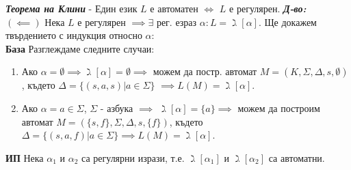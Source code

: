 \documentclass[fleqn,12pt]{article}
\begin{document}
\begin{flushleft}
\textit{\textbf{Теорема на Клини}} - Един език $L$ е автоматен $\iff$ $L$ е регулярен.
\textit{\textbf{Д-во:}}\\
$(\impliedby)$ Нека $L$ е регулярен $\implies \exists$ рег. езраз $\alpha: L = \gimel[\alpha]$. Ще докажем твърдението с индукция относно $\alpha$: \\
\textbf{База} Разглеждаме следните случаи:
\begin{enumerate}
    \item Ако $\alpha = \emptyset \implies \gimel[\alpha] = \emptyset \implies$ можем да постр. автомат $M = (K, \Sigma, \Delta, s, \emptyset)$, където $\Delta = \{(s, a, s) | a \in \Sigma\}$ $\implies L(M) = \gimel[\alpha]$. \\
    \item Ако $\alpha = a \in \Sigma$, $\Sigma$ - азбука $\implies$ $\gimel[\alpha] = \{a\} \implies$ можем да построим автомат $M = (\{s, f\}, \Sigma, \Delta, s, \{f\})$, където $\Delta = \{(s, a, f) | a \in \Sigma\} \implies L(M) = \gimel[\alpha]$.\\
\end{enumerate}

\textbf{ИП} Нека $\alpha_1$ и $\alpha_2$ са регулярни изрази, т.е. $\gimel[\alpha_1]$ и $\gimel[\alpha_2]$ са автоматни.


\end{flushleft}
\end{document}
